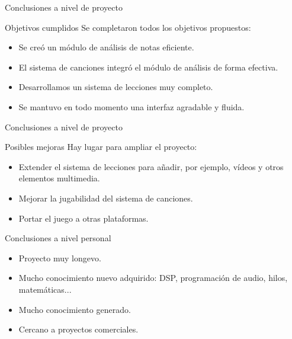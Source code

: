 \begin{frame}{Conclusiones a nivel de proyecto}
  \begin{block}{Objetivos cumplidos}
    Se completaron todos los objetivos propuestos:
    \begin{itemize}
    \item Se creó un módulo de análisis de notas eficiente.
    \item El sistema de canciones integró el módulo de análisis de forma
      efectiva.
    \item Desarrollamos un sistema de lecciones muy completo.
    \item Se mantuvo en todo momento una interfaz agradable y fluida.
    \end{itemize}    
  \end{block} 
\end{frame}

\begin{frame}{Conclusiones a nivel de proyecto}
  \begin{block}{Posibles mejoras}
    Hay lugar para ampliar el proyecto:
    \begin{itemize}
    \item Extender el sistema de lecciones para añadir, por ejemplo, vídeos y
      otros elementos multimedia.
    \item Mejorar la jugabilidad del sistema de canciones.
    \item Portar el juego a otras plataformas.
    \end{itemize}
  \end{block}  
\end{frame}

\begin{frame}{Conclusiones a nivel personal}
  \begin{itemize}
  \item Proyecto muy longevo.
  \item Mucho conocimiento nuevo adquirido: DSP, programación de audio, hilos,
    matemáticas...
  \item Mucho conocimiento generado.
  \item Cercano a proyectos comerciales.
  \end{itemize}
\end{frame}

